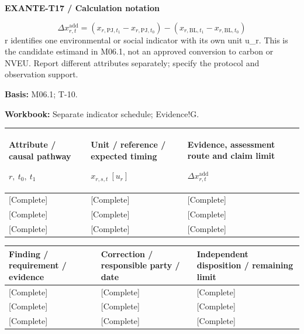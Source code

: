 \textbf{EXANTE-T17 / Calculation notation}\par
{\fontsize{9}{11}\selectfont\[ \Delta x_{r,t}^{\mathrm{add}}=(x_{r,\mathrm{PJ},t_1}-x_{r,\mathrm{PJ},t_0})-(x_{r,\mathrm{BL},t_1}-x_{r,\mathrm{BL},t_0}) \]}
r identifies one environmental or social indicator with its own unit u\_r. This is the candidate estimand in M06.1, not an approved conversion to carbon or NVEU. Report different attributes separately; specify the protocol and observation support.\par
\textbf{Basis:} M06.1; T-10.\par
\textbf{Workbook:} Separate indicator schedule; Evidence!G.\par\endgroup
{\sffamily\fontsize{8.3}{10.3}\selectfont\begin{longtable}{@{}P{54.83mm} P{54.83mm} P{54.83mm}@{}}
\toprule
\textbf{Attribute / causal pathway}\par {\normalfont\fontsize{8.2}{10}\selectfont $r,\ t_0,\ t_1$} & \textbf{Unit / reference / expected timing}\par {\normalfont\fontsize{8.2}{10}\selectfont $x_{r,s,t}\ [u_r]$} & \textbf{Evidence, assessment route and claim limit}\par {\normalfont\fontsize{8.2}{10}\selectfont $\Delta x_{r,t}^{\mathrm{add}}$}\\\midrule\endhead
\rule{0pt}{8mm}[Complete] & [Complete] & [Complete]\\\hline
\rule{0pt}{8mm}[Complete] & [Complete] & [Complete]\\\hline
\rule{0pt}{8mm}[Complete] & [Complete] & [Complete]\\\hline
\end{longtable}}
{\sffamily\fontsize{8.3}{10.3}\selectfont\begin{longtable}{@{}P{54.83mm} P{54.83mm} P{54.83mm}@{}}
\toprule
\textbf{Finding / requirement / evidence} & \textbf{Correction / responsible party / date} & \textbf{Independent disposition / remaining limit}\\\midrule\endhead
\rule{0pt}{8mm}[Complete] & [Complete] & [Complete]\\\hline
\rule{0pt}{8mm}[Complete] & [Complete] & [Complete]\\\hline
\rule{0pt}{8mm}[Complete] & [Complete] & [Complete]\\\hline
\end{longtable}}
